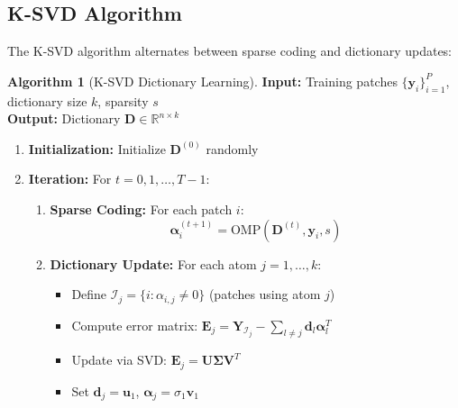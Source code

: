 \documentclass[12pt]{article}
\renewcommand{\vec}[1]{\mathbf{#1}}
\theoremstyle{definition}
\newtheorem{algorithm}[theorem]{Algorithm}
\begin{document}
\subsection{K-SVD Algorithm}
\label{subsec:ksvd}

The K-SVD algorithm alternates between sparse coding and dictionary updates:

\begin{algorithm}[K-SVD Dictionary Learning]
    \label{alg:ksvd}
    \textbf{Input:} Training patches $\{\vec{y}_i\}_{i=1}^P$, dictionary size $k$, sparsity $s$\\
    \textbf{Output:} Dictionary $\mathbf{D} \in \mathbb{R}^{n \times k}$
    \begin{enumerate}[label=\textbf{\arabic*.}]
        \item \textbf{Initialization:} Initialize $\mathbf{D}^{(0)}$ randomly
        \item \textbf{Iteration:} For $t = 0, 1, \ldots, T-1$:
              \begin{enumerate}[label=\textbf{(\alph*)}]
                  \item \textbf{Sparse Coding:} For each patch $i$:
                        \begin{equation}
                            \vec{\alpha}_i^{(t+1)} = \text{OMP}(\mathbf{D}^{(t)}, \vec{y}_i, s)
                        \end{equation}

                  \item \textbf{Dictionary Update:} For each atom $j = 1, \ldots, k$:
                        \begin{itemize}
                            \item Define $\mathcal{I}_j = \{i : \alpha_{i,j} \neq 0\}$ (patches using atom $j$)
                            \item Compute error matrix: $\mathbf{E}_j = \mathbf{Y}_{\mathcal{I}_j} - \sum_{l \neq j} \vec{d}_l \vec{\alpha}_l^T$
                            \item Update via SVD: $\mathbf{E}_j = \mathbf{U}\mathbf{\Sigma}\mathbf{V}^T$
                            \item Set $\vec{d}_j = \vec{u}_1$, $\vec{\alpha}_j = \sigma_1 \vec{v}_1$
                        \end{itemize}
              \end{enumerate}
    \end{enumerate}
\end{algorithm}
\end{document}

